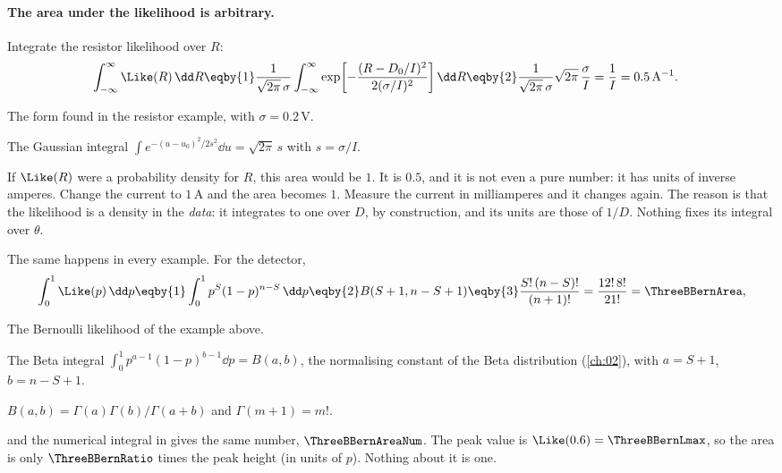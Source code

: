 \paragraph{The area under the likelihood is arbitrary.}
Integrate the resistor likelihood over $R$:
\begin{align*}
  \int_{-\infty}^{\infty}\Like(R)\,\dd R
  &\eqby{1}\frac{1}{\sqrt{2\pi}\,\sigma}\int_{-\infty}^{\infty}
     \exp\!\left[-\frac{(R-D_0/I)^2}{2(\sigma/I)^2}\right]\dd R
   \eqby{2}\frac{1}{\sqrt{2\pi}\,\sigma}\sqrt{2\pi}\,\frac{\sigma}{I}
   =\frac1I = 0.5\,\mathrm{A}^{-1}.
\end{align*}
\begin{explain}
  \item The form found in the resistor example, with $\sigma=0.2\,$V.
  \item The Gaussian integral
        $\int e^{-(u-u_0)^2/2s^2}\dd u=\sqrt{2\pi}\,s$ with $s=\sigma/I$.
\end{explain}
If $\Like(R)$ were a probability density for $R$, this area would be $1$.
It is $0.5$, and it is not even a pure number: it has units of inverse
amperes. Change the current to $1\,$A and the area becomes $1$. Measure the
current in milliamperes and it changes again. The reason is that the
likelihood is a density in the \emph{data}: it integrates to one over $D$,
by construction, and its units are those of $1/D$. Nothing fixes its
integral over $\theta$.

The same happens in every example. For the detector,
\begin{align*}
  \int_0^1\Like(p)\,\dd p
  \eqby{1}\int_0^1p^{S}(1-p)^{n-S}\,\dd p
  \eqby{2}B(S+1,n-S+1)
  \eqby{3}\frac{S!\,(n-S)!}{(n+1)!}
  =\frac{12!\,8!}{21!}=\ThreeBBernArea ,
\end{align*}
\begin{explain}
  \item The Bernoulli likelihood of the example above.
  \item The Beta integral $\int_0^1p^{a-1}(1-p)^{b-1}\dd p=B(a,b)$, the
        normalising constant of the Beta distribution (\cref{ch:02}), with
        $a=S+1$, $b=n-S+1$.
  \item $B(a,b)=\Gamma(a)\Gamma(b)/\Gamma(a+b)$ and $\Gamma(m+1)=m!$.
\end{explain}
and the numerical integral in  gives the
same number, $\ThreeBBernAreaNum$. The peak value is
$\Like(0.6)=\ThreeBBernLmax$, so the area is only $\ThreeBBernRatio$ times
the peak height (in units of $p$). Nothing about it is one.


